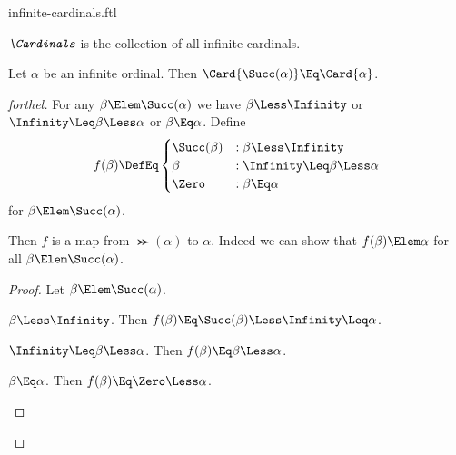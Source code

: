 \documentclass{stex}
\begin{document}
\begin{smodule}{infinite-cardinals.ftl}



\begin{definition*}[forthel,for=Cardinals]
  $\emph{\Cardinals}$ is the collection of all infinite cardinals.
\end{definition*}

\begin{proposition*}[forthel]
  Let $\alpha$ be an infinite ordinal.
  Then $\Card{\Succ(\alpha)} \Eq \Card{\alpha}$.
\end{proposition*}
\begin{proof}[forthel]
  For any $\beta \Elem \Succ(\alpha)$ we have
  $\beta \Less \Infinity$ or $\Infinity \Leq \beta \Less \alpha$ or $\beta \Eq \alpha$.
  Define \[ f(\beta) \DefEq
    \begin{cases}
      \Succ(\beta) & : \beta \Less \Infinity
      \\
      \beta           & : \Infinity \Leq \beta \Less \alpha
      \\
      \Zero        & : \beta \Eq \alpha
    \end{cases} \]
  for $\beta \Elem \Succ(\alpha)$.

  Then $f$ is a map from $\Succ(\alpha)$ to $\alpha$.
  Indeed we can show that $f(\beta) \Elem \alpha$ for all
  $\beta \Elem \Succ(\alpha)$.
  \begin{proof}
    Let $\beta \Elem \Succ(\alpha)$.

    \begin{case}{$\beta \Less \Infinity$.}
      Then $f(\beta)
        \Eq \Succ(\beta)
        \Less \Infinity
        \Leq \alpha$.
    \end{case}

    \begin{case}{$\Infinity \Leq \beta \Less \alpha$.}
      Then $f(\beta)
        \Eq \beta
        \Less \alpha$.
    \end{case}

    \begin{case}{$\beta \Eq \alpha$.}
      Then $f(\beta)
        \Eq \Zero
        \Less \alpha$.
    \end{case}
  \end{proof}


\end{proof}
\end{smodule}
\end{document}
